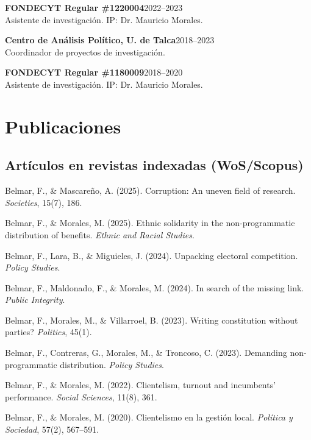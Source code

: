 \documentclass[11pt,a4paper]{article}
\newcommand{\cvitem}[2]{\noindent\textbf{#1}\hfill #2\\[2pt]}
\newcommand{\cvdetail}[1]{\noindent\hspace{0.3cm}#1\par\vspace{4pt}}
\begin{document}
\cvitem{FONDECYT Regular \#1220004}{2022--2023}
\cvdetail{Asistente de investigación. IP: Dr. Mauricio Morales.}

\vspace{4pt}

\cvitem{Centro de Análisis Político, U. de Talca}{2018--2023}
\cvdetail{Coordinador de proyectos de investigación.}

\vspace{4pt}

\cvitem{FONDECYT Regular \#1180009}{2018--2020}
\cvdetail{Asistente de investigación. IP: Dr. Mauricio Morales.}

\section{Publicaciones}

\subsection*{Artículos en revistas indexadas (WoS/Scopus)}

\begin{enumerate}[leftmargin=*, label={[\arabic*]}]
    \item Belmar, F., \& Mascareño, A. (2025). Corruption: An uneven field of research. \textit{Societies}, 15(7), 186.

    \item Belmar, F., \& Morales, M. (2025). Ethnic solidarity in the non-programmatic distribution of benefits. \textit{Ethnic and Racial Studies}.

    \item Belmar, F., Lara, B., \& Miguieles, J. (2024). Unpacking electoral competition. \textit{Policy Studies}.

    \item Belmar, F., Maldonado, F., \& Morales, M. (2024). In search of the missing link. \textit{Public Integrity}.

    \item Belmar, F., Morales, M., \& Villarroel, B. (2023). Writing constitution without parties? \textit{Politics}, 45(1).

    \item Belmar, F., Contreras, G., Morales, M., \& Troncoso, C. (2023). Demanding non-programmatic distribution. \textit{Policy Studies}.

    \item Belmar, F., \& Morales, M. (2022). Clientelism, turnout and incumbents' performance. \textit{Social Sciences}, 11(8), 361.

    \item Belmar, F., \& Morales, M. (2020). Clientelismo en la gestión local. \textit{Política y Sociedad}, 57(2), 567--591.
\end{enumerate}
\end{document}
